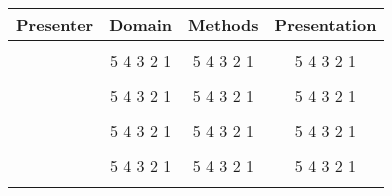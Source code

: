 \documentclass[12pt]{article}
\begin{document}
\begin{center}
\begin{tabular}{cccc}
\toprule
Presenter & Domain & Methods & Presentation\\
\midrule \\
 & \phantom{xxx}5 4 3 2 1 \phantom{xxx} & \phantom{xxx}5 4 3 2 1 \phantom{xxx} & \phantom{xxx} 5 4 3 2 1 \phantom{xxx} \\\\
 & \phantom{xxx}5 4 3 2 1 \phantom{xxx} & \phantom{xxx}5 4 3 2 1 \phantom{xxx} & \phantom{xxx} 5 4 3 2 1 \phantom{xxx} \\\\
 & \phantom{xxx}5 4 3 2 1 \phantom{xxx} & \phantom{xxx}5 4 3 2 1 \phantom{xxx} & \phantom{xxx} 5 4 3 2 1 \phantom{xxx} \\\\
 & \phantom{xxx}5 4 3 2 1 \phantom{xxx} & \phantom{xxx}5 4 3 2 1 \phantom{xxx} & \phantom{xxx} 5 4 3 2 1 \phantom{xxx} \\\\
\bottomrule
\end{tabular}
\end{center}
\end{document}
